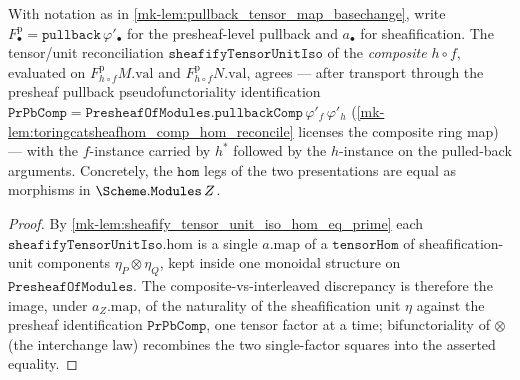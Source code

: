 \begin{lemma}
  \label{mk-lem:sheafify_tensor_unit_iso_comp}
  \lean{}
  With notation as in \ref{mk-lem:pullback_tensor_map_basechange}, write \(F^{\mathrm p}_\bullet =
  \mathtt{pullback}\,\varphi'_\bullet\) for the presheaf-level pullback and \(a_\bullet\) for
  sheafification. The tensor/unit reconciliation \(\mathtt{sheafifyTensorUnitIso}\) of the
  \emph{composite} \(h \circ f\), evaluated on \(F^{\mathrm p}_{h\circ f}M.\mathrm{val}\) and
  \(F^{\mathrm p}_{h\circ f}N.\mathrm{val}\), agrees --- after transport through the presheaf
  pullback pseudofunctoriality identification
  \(\mathtt{PrPbComp} = \mathtt{PresheafOfModules.pullbackComp}\,\varphi'_f\,\varphi'_h\)
  (\ref{mk-lem:toringcatsheafhom_comp_hom_reconcile} licenses the composite ring map) --- with the
  \(f\)-instance carried by \(h^{*}\) followed by the \(h\)-instance on the pulled-back arguments.
  Concretely, the \(\mathtt{hom}\) legs of the two presentations are equal as morphisms in
  \(\Scheme.\mathtt{Modules}\,Z\).
\end{lemma}
\begin{proof}
  By \ref{mk-lem:sheafify_tensor_unit_iso_hom_eq_prime} each \(\mathtt{sheafifyTensorUnitIso}.\mathrm{hom}\)
  is a single \(a.\mathrm{map}\) of a \(\mathtt{tensorHom}\) of sheafification-unit components
  \(\eta_P \otimes \eta_Q\), kept inside one monoidal structure on \(\mathtt{PresheafOfModules}\).
  The composite-vs-interleaved discrepancy is therefore the image, under \(a_Z.\mathrm{map}\), of the
  naturality of the sheafification unit \(\eta\) against the presheaf identification \(\mathtt{PrPbComp}\),
  one tensor factor at a time; bifunctoriality of \(\otimes\) (the interchange law) recombines the two
  single-factor squares into the asserted equality.
\end{proof}

